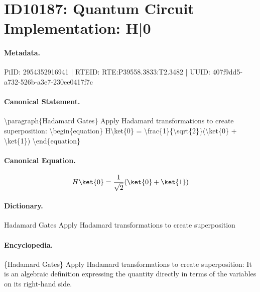 \section*{ID10187: Quantum Circuit Implementation: H|0}
\paragraph{Metadata.}
PiID: 2954352916941 | RTEID: RTE:P39558.3833:T2.3482 | UUID: 407f9dd5-a732-526b-a3e7-230ee0417f7c

\paragraph{Canonical Statement.}
\textbackslash{}paragraph\{Hadamard Gates\} Apply Hadamard transformations to create superposition: \textbackslash{}begin\{equation\} H\textbackslash{}ket\{0\} = \textbackslash{}frac\{1\}\{\textbackslash{}sqrt\{2\}\}(\textbackslash{}ket\{0\} + \textbackslash{}ket\{1\}) \textbackslash{}end\{equation\}

\paragraph{Canonical Equation.}
\[
H\ket{0} = \frac{1}{\sqrt{2}}(\ket{0} + \ket{1})
\]

\paragraph{Dictionary.}
Hadamard Gates Apply Hadamard transformations to create superposition

\paragraph{Encyclopedia.}
\{Hadamard Gates\} Apply Hadamard transformations to create superposition: It is an algebraic definition expressing the quantity directly in terms of the variables on its right-hand side.

